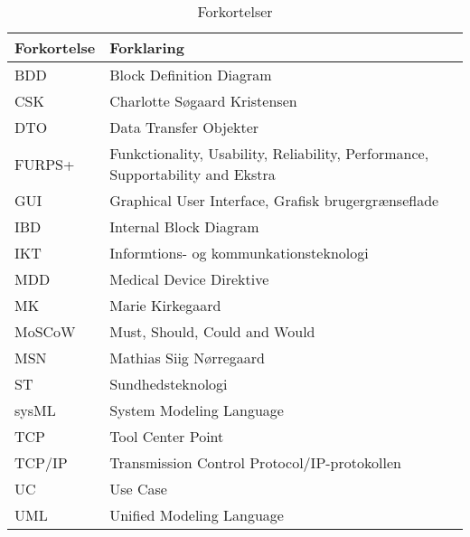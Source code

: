 \begin{table}[htb]
\begin{tabular}{ | m{6em} | m{30em} | } \hline

\textbf{Forkortelse} & \textbf{Forklaring} \\ \hline
BDD & Block Definition Diagram \\\hline
CSK & Charlotte Søgaard Kristensen \\ \hline 
DTO & Data Transfer Objekter \\\hline
FURPS+ & Funkctionality, Usability, Reliability, Performance, Supportability and Ekstra \\\hline
GUI & Graphical User Interface, Grafisk brugergrænseflade \\ \hline 
IBD & Internal Block Diagram \\\hline
IKT & Informtions- og kommunkationsteknologi\\\hline
MDD & Medical Device Direktive \\\hline
MK &  Marie Kirkegaard \\ \hline
MoSCoW & Must, Should, Could and Would \\\hline
MSN & Mathias Siig Nørregaard \\ \hline 
ST & Sundhedsteknologi \\\hline
sysML &  System Modeling Language \\\hline
TCP & Tool Center Point \\\hline
TCP/IP & Transmission Control Protocol/IP-protokollen \\\hline
UC & Use Case \\\hline
UML & Unified Modeling Language\\\hline
\end{tabular}
\caption{Forkortelser}
\end{table}
\newpage

